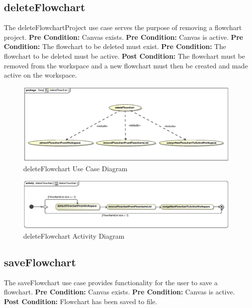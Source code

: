 \documentclass[11pt,a4paper,titlepage]{article}
\begin{document}
\subsection{deleteFlowchart}
The deleteFlowchartProject use case serves the purpose of removing a flowchart project.\newline\newline
\textbf{Pre Condition:} Canvas exists.\newline
\textbf{Pre Condition:} Canvas is active.\newline
\textbf{Pre Condition:} The flowchart to be deleted must exist.\newline
\textbf{Pre Condition:} The flowchart to be deleted must be active.\newline\newline
\textbf{Post Condition:} The flowchart must be removed from the workspace and a new flowchart must then be created and made active on the workspace.

\begin{figure}[H]
  \centering
\includegraphics[width=500px]{deleteFlowchart.eps}
\caption{deleteFlowchart Use Case Diagram}
\end{figure}

\begin{figure}[H]
  \centering
\includegraphics[width=500px]{deleteFlowchartActivity.eps}
\caption{deleteFlowchart Activity Diagram}
\end{figure}

\newpage
\subsection{saveFlowchart}
The saveFlowchart use case provides functionality for the user to save a flowchart.\newline\newline
\textbf{Pre Condition:} Canvas exists.\newline
\textbf{Pre Condition:} Canvas is active.\newline\newline
\textbf{Post Condition:} Flowchart has been saved to file.
\end{document}
